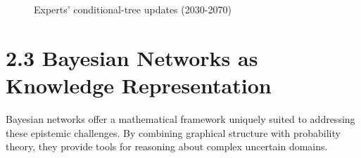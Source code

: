 \documentclass[
  11pt,
  letterpaper,
]{book}
\begin{document}
\begin{figure}


\caption[Experts' conditional-tree updates
(2030-2070)]{\label{fig-concerned_experts}Experts' conditional-tree
updates (2030-2070)}

\end{figure}%

\textcite{mccaslin2024}

\textcite{tetlock2022}

\textcite{gruetzemacher2022}

\section*{2.3 Bayesian Networks as Knowledge
Representation}\label{sec-bayesian-networks}


Bayesian networks offer a mathematical framework uniquely suited to
addressing these epistemic challenges. By combining graphical structure
with probability theory, they provide tools for reasoning about complex
uncertain domains.
\end{document}
